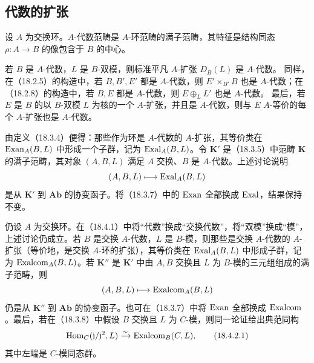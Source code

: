 \subsection{代数的扩张}
设 $A$ 为交换环。$A$-代数范畴是 $A$-环范畴的满子范畴，其特征是结构同态 $\rho:A\to B$ 的像包含于 $B$ 的中心。

若 $B$ 是 $A$-代数，$L$ 是 $B$-双模，则标准平凡 $A$-扩张 $D_B(L)$ 是 $A$-代数。
同样，在（18.2.5）的构造中，若 $B,B',E'$ 都是 $A$-代数，则 $E'\times_{B'}B$ 也是 $A$-代数；在（18.2.8）的构造中，若 $B,E$ 都是 $A$-代数，则 $E\oplus_LL'$ 也是 $A$-代数。
最后，若 $E$ 是 $B$ 的以 $B$-双模 $L$ 为核的一个 $A$-扩张，并且是 $A$-代数，则与 $E$ $A$-等价的每个 $A$-扩张也是 $A$-代数。

由定义（18.3.4）便得：那些作为环是 $A$-代数的 $A$-扩张，其等价类在 $\operatorname{Exan}_A(B,L)$ 中形成一个子群，记为 $\operatorname{Exal}_A(B,L)$。令 $\mathbf K'$ 是（18.3.5）中范畴 $\mathbf K$ 的满子范畴，其对象 $(A,B,L)$ 满足 $A$ 交换、$B$ 是 $A$-代数。上述讨论说明
\[
 (A,B,L)\longmapsto\operatorname{Exal}_A(B,L)
\]
是从 $\mathbf K'$ 到 $\mathbf{Ab}$ 的协变函子。将（18.3.7）中的 $\operatorname{Exan}$ 全部换成 $\operatorname{Exal}$，结果保持不变。

仍设 $A$ 为交换环。在（18.4.1）中将“代数”换成“交换代数”，将“双模”换成“模”，上述讨论仍成立。若 $B$ 是交换 $A$-代数，$L$ 是 $B$-模，则那些是交换 $A$-代数的 $A$-扩张（等价地，是交换 $A$-环的扩张），其等价类在 $\operatorname{Exal}_A(B,L)$ 中形成子群，记为 $\operatorname{Exalcom}_A(B,L)$。若 $\mathbf K''$ 是 $\mathbf K'$ 中由 $A,B$ 交换且 $L$ 为 $B$-模的三元组组成的满子范畴，则
\[
 (A,B,L)\longmapsto\operatorname{Exalcom}_A(B,L)
\]
仍是从 $\mathbf K''$ 到 $\mathbf{Ab}$ 的协变函子。也可在（18.3.7）中将 $\operatorname{Exan}$ 全部换成 $\operatorname{Exalcom}$。最后，若在（18.3.8）中假设 $B$ 交换且 $L$ 为 $C$-模，则同一论证给出典范同构
\begin{equation}
 \operatorname{Hom}_C(\mathfrak j/\mathfrak j^2,L)\xrightarrow{\sim}\operatorname{Exalcom}_B(C,L),
 \tag{18.4.2.1}
\end{equation}
其中左端是 $C$-模同态群。

